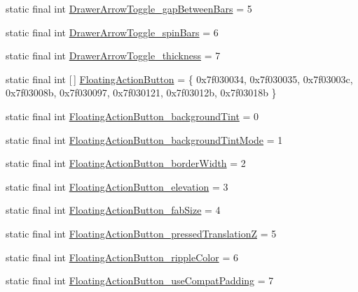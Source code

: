 \begin{DoxyCompactItemize}
\item 
static final int \mbox{\hyperlink{classandroid_1_1support_1_1design_1_1R_1_1styleable_a2ae57027db3b52747cd4fe6891be50ae}{Drawer\+Arrow\+Toggle\+\_\+gap\+Between\+Bars}} = 5
\item 
static final int \mbox{\hyperlink{classandroid_1_1support_1_1design_1_1R_1_1styleable_a192aaf9e5f494152409e8bd792ca49e6}{Drawer\+Arrow\+Toggle\+\_\+spin\+Bars}} = 6
\item 
static final int \mbox{\hyperlink{classandroid_1_1support_1_1design_1_1R_1_1styleable_a3ad2ad7d27382bb2a96f303bef508661}{Drawer\+Arrow\+Toggle\+\_\+thickness}} = 7
\item 
static final int \mbox{[}$\,$\mbox{]} \mbox{\hyperlink{classandroid_1_1support_1_1design_1_1R_1_1styleable_ac39eabec239d50ec950ae5f013825830}{Floating\+Action\+Button}} = \{ 0x7f030034, 0x7f030035, 0x7f03003c, 0x7f03008b, 0x7f030097, 0x7f030121, 0x7f03012b, 0x7f03018b \}
\item 
static final int \mbox{\hyperlink{classandroid_1_1support_1_1design_1_1R_1_1styleable_a85f23456b7532cd6277a61b75950a347}{Floating\+Action\+Button\+\_\+background\+Tint}} = 0
\item 
static final int \mbox{\hyperlink{classandroid_1_1support_1_1design_1_1R_1_1styleable_aec998f25022d4f6c553ba33ad00d1cb4}{Floating\+Action\+Button\+\_\+background\+Tint\+Mode}} = 1
\item 
static final int \mbox{\hyperlink{classandroid_1_1support_1_1design_1_1R_1_1styleable_a4357081bb8fe8824282e54ef9f4ae3cc}{Floating\+Action\+Button\+\_\+border\+Width}} = 2
\item 
static final int \mbox{\hyperlink{classandroid_1_1support_1_1design_1_1R_1_1styleable_a52c86e4b7032178a47c2a0509d3dfa7d}{Floating\+Action\+Button\+\_\+elevation}} = 3
\item 
static final int \mbox{\hyperlink{classandroid_1_1support_1_1design_1_1R_1_1styleable_a6c9839a534ad6bc71d39c9655b6d8f91}{Floating\+Action\+Button\+\_\+fab\+Size}} = 4
\item 
static final int \mbox{\hyperlink{classandroid_1_1support_1_1design_1_1R_1_1styleable_a0051f7f3dbf011baf338d3a1da28adb9}{Floating\+Action\+Button\+\_\+pressed\+TranslationZ}} = 5
\item 
static final int \mbox{\hyperlink{classandroid_1_1support_1_1design_1_1R_1_1styleable_a321eed9129c57174a965ba1530752167}{Floating\+Action\+Button\+\_\+ripple\+Color}} = 6
\item 
static final int \mbox{\hyperlink{classandroid_1_1support_1_1design_1_1R_1_1styleable_a5d75507e72251aaff3183114398f507c}{Floating\+Action\+Button\+\_\+use\+Compat\+Padding}} = 7

\end{DoxyCompactItemize}
